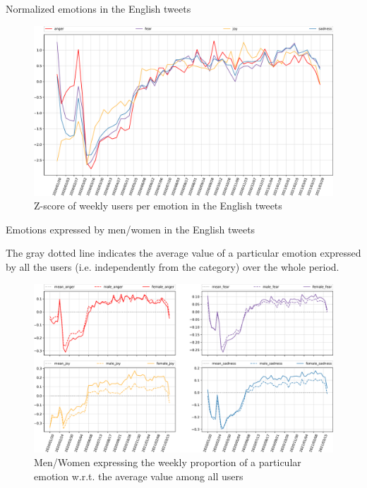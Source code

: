 \documentclass[8pt]{beamer}  %
\begin{document}
\begin{frame}{Normalized emotions in the English tweets}

    \begin{figure}[H]
    	\centering
    	\includegraphics[scale=.25]{assets/img/en_4_emotions_standardized.svg.pdf}
    	\caption{Z-score of weekly users per emotion in the English tweets}
    	\label{fig:en-4-emotions-std}
    \end{figure}
    
\end{frame}

\begin{frame}{Emotions expressed by men/women in the English tweets}

    The gray dotted line indicates the average value of a particular emotion expressed by all the users (i.e. independently from the category) over the whole period.

    \begin{figure}[H]
	    \centering
    	\includegraphics[scale=.22]{assets/img/en_4_emotions_per_category_over_mean_subplot_1.svg.pdf}
    	\caption{Men/Women expressing the weekly proportion of a particular emotion w.r.t. the average value among all users}
    	\label{fig:en-4-emotions-per-category-course-mean-1}
    \end{figure}
    
\end{frame}
\end{document}
